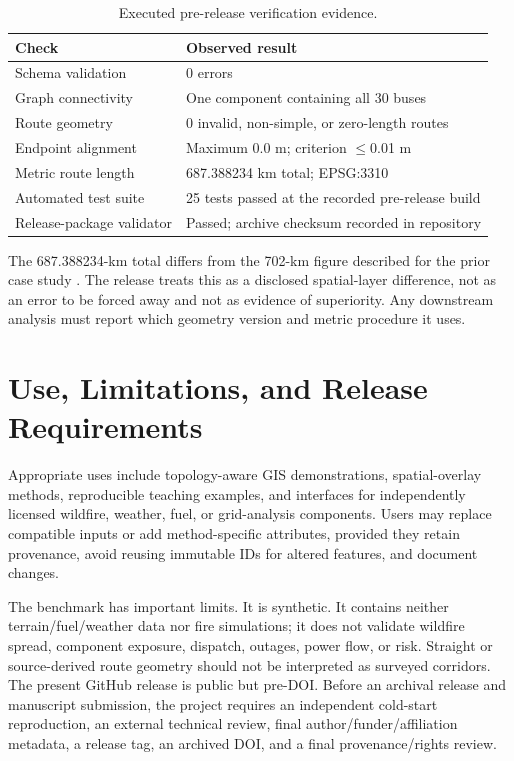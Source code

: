 \documentclass[10pt,journal]{IEEEtran}
\begin{document}
\begin{table}[!t]
\caption{Executed pre-release verification evidence.}
\label{tab:verification}
\centering
\footnotesize
\begin{tabular}{p{}p{}}
\toprule
Check & Observed result \\
\midrule
Schema validation & 0 errors \\
Graph connectivity & One component containing all 30 buses \\
Route geometry & 0 invalid, non-simple, or zero-length routes \\
Endpoint alignment & Maximum 0.0 m; criterion $\leq$0.01 m \\
Metric route length & 687.388234 km total; EPSG:3310 \\
Automated test suite & 25 tests passed at the recorded pre-release build \\
Release-package validator & Passed; archive checksum recorded in repository \\
\bottomrule
\end{tabular}
\end{table}

The 687.388234-km total differs from the 702-km figure described for the prior case study \cite{sohrabi2024wildfire}. The release treats this as a disclosed spatial-layer difference, not as an error to be forced away and not as evidence of superiority. Any downstream analysis must report which geometry version and metric procedure it uses.

\section{Use, Limitations, and Release Requirements}
Appropriate uses include topology-aware GIS demonstrations, spatial-overlay methods, reproducible teaching examples, and interfaces for independently licensed wildfire, weather, fuel, or grid-analysis components. Users may replace compatible inputs or add method-specific attributes, provided they retain provenance, avoid reusing immutable IDs for altered features, and document changes.

The benchmark has important limits. It is synthetic. It contains neither terrain/fuel/weather data nor fire simulations; it does not validate wildfire spread, component exposure, dispatch, outages, power flow, or risk. Straight or source-derived route geometry should not be interpreted as surveyed corridors. The present GitHub release is public but pre-DOI. Before an archival release and manuscript submission, the project requires an independent cold-start reproduction, an external technical review, final author/funder/affiliation metadata, a release tag, an archived DOI, and a final provenance/rights review.
\end{document}

